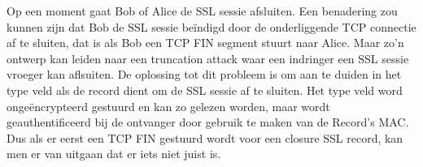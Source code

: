 
Op een moment gaat Bob of Alice de SSL sessie afsluiten. Een benadering zou kunnen zijn dat Bob de SSL sessie beïndigd door de onderliggende TCP connectie af te sluiten, dat is als Bob een TCP FIN segment stuurt naar Alice. Maar zo’n ontwerp kan leiden naar een truncation attack waar een indringer een SSL sessie vroeger kan aflsuiten.
De oplossing tot dit probleem is om aan te duiden in het type veld als de record dient om de SSL sessie af te sluiten. Het type veld word ongeëncrypteerd gestuurd en kan zo gelezen worden, maar wordt geauthentificeerd bij de ontvanger door gebruik te maken van de Record’s MAC. Dus als er eerst een TCP FIN gestuurd wordt voor een closure SSL record, kan men er van uitgaan dat er iets niet juist is.
